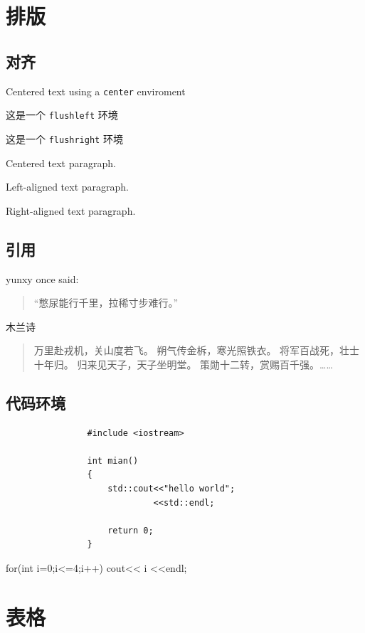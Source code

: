 \documentclass{ctexart}
\begin{document}
	\section{排版}
		\subsection{对齐}
			\begin{center}
			Centered text using a \verb|center| enviroment
			\end{center}
			\begin{flushleft}
			这是一个 \verb|flushleft| 环境
			\end{flushleft}
			\begin{flushright}
			这是一个 \verb|flushright| 环境
			\end{flushright}

			\centering
			Centered text paragraph.\par
			\raggedleft
			Left-aligned text paragraph.\par
			\raggedright
			Right-aligned text paragraph.\par
		\subsection{引用}
			yunxy once said:
			\begin{quote}
				“憋尿能行千里，拉稀寸步难行。”
			\end{quote}
			木兰诗
			\begin{quotation}
				万里赴戎机，关山度若飞。
				朔气传金柝，寒光照铁衣。
				将军百战死，壮士十年归。
				归来见天子，天子坐明堂。
				策勋十二转，赏赐百千强。……
			\end{quotation}
		\subsection{代码环境}
			\begin{verbatim}
				#include <iostream>

				int mian()
				{
					std::cout<<"hello world";
							 <<std::endl;

					return 0;
				}
			\end{verbatim}
			
			\begin{verbatim*}
				for(int i=0;i<=4;i++){
					cout<< i <<endl;
				}
			\end{verbatim*}
	\section{表格}
\end{document}
